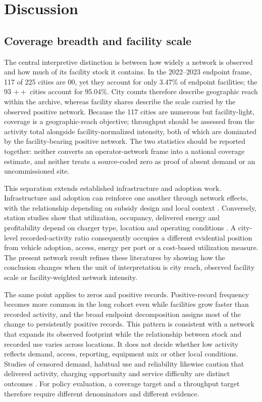 \section{Discussion}

\subsection{Coverage breadth and facility scale}
The central interpretive distinction is between how widely a network is observed and how much of its facility stock it contains. In the 2022--2023 endpoint frame, 117 of 225 cities are $00$, yet they account for only 3.47\% of endpoint facilities; the 93 $++$ cities account for 95.04\%. City counts therefore describe geographic reach within the archive, whereas facility shares describe the scale carried by the observed positive network. Because the 117 cities are numerous but facility-light, coverage is a geographic-reach objective; throughput should be assessed from the activity total alongside facility-normalized intensity, both of which are dominated by the facility-bearing positive network. The two statistics should be reported together: neither converts an operator-network frame into a national coverage estimate, and neither treats a source-coded zero as proof of absent demand or an uncommissioned site.

This separation extends established infrastructure and adoption work. Infrastructure and adoption can reinforce one another through network effects, with the relationship depending on subsidy design and local context \citep{li2017,springel2021,burra2024,hu2025_charging}. Conversely, station studies show that utilization, occupancy, delivered energy and profitability depend on charger type, location and operating conditions \citep{borlaug2023,hecht2022,zhao2024_utilization,du2024_accessibility,zheng2025_landuse}. A city-level recorded-activity ratio consequently occupies a different evidential position from vehicle adoption, access, energy per port or a cost-based utilization measure. The present network result refines these literatures by showing how the conclusion changes when the unit of interpretation is city reach, observed facility scale or facility-weighted network intensity.

The same point applies to zeros and positive records. Positive-record frequency becomes more common in the long cohort even while facilities grow faster than recorded activity, and the broad endpoint decomposition assigns most of the change to persistently positive records. This pattern is consistent with a network that expands its observed footprint while the relationship between stock and recorded use varies across locations. It does not decide whether low activity reflects demand, access, reporting, equipment mix or other local conditions. Studies of censored demand, habitual use and reliability likewise caution that delivered activity, charging opportunity and service difficulty are distinct outcomes \citep{huttel2023,weekx2024,weekx2025_habits,patil2023,yu2025_reliability}. For policy evaluation, a coverage target and a throughput target therefore require different denominators and different evidence.

